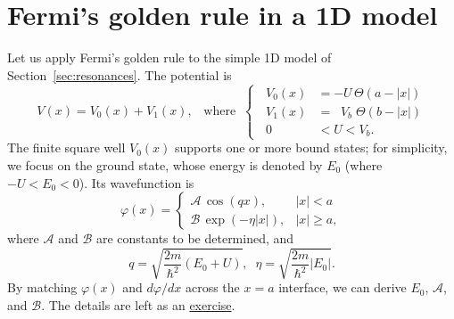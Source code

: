 \documentclass[pra,12pt]{revtex4-2}
\begin{document}
\section{Fermi's golden rule in a 1D model}
\label{sec:fgr1d}

Let us apply Fermi's golden rule to the simple 1D model of
Section~\ref{sec:resonances}.  The potential is
\begin{equation}
  V(x) = V_0(x) + V_1(x), \;\;\;\mathrm{where}\;\;
  \left\{\;\;
  \begin{aligned}
    V_0(x) &= -U \, \Theta(a-|x|) \\
    V_1(x) &= \;\;V_b\; \Theta(b-|x|) \\
    0 &<U<V_b.
  \end{aligned}\right.
\end{equation}
The finite square well $V_0(x)$ supports one or more bound states; for
simplicity, we focus on the ground state, whose energy is denoted by
$E_0$ (where $-U < E_0 < 0$).  Its wavefunction is
\begin{equation}
  \varphi(x) = \begin{cases}\mathcal{A}\,\cos(qx), & |x| < a \\
    \mathcal{B} \, \exp\left(-\eta|x|\right), & |x| \ge a,\end{cases}
  \label{varphiansatz0}
\end{equation}
where $\mathcal{A}$ and $\mathcal{B}$ are constants to be determined,
and
\begin{equation}
  q = \sqrt{\frac{2m}{\hbar^2}(E_0+U)}, \;\; \eta = \sqrt{\frac{2m}{\hbar^2}|E_0|}.
\end{equation}
By matching $\varphi(x)$ and $d\varphi/dx$ across the $x=a$ interface,
we can derive $E_0$, $\mathcal{A}$, and $\mathcal{B}$.  The details
are left as an \hyperref[ex:1dfgr]{exercise}.
\end{document}
